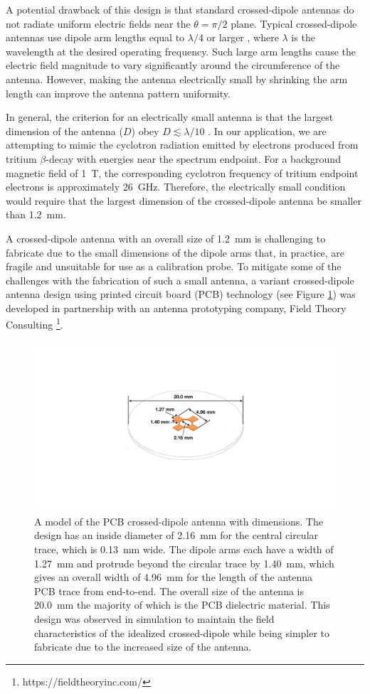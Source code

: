 A potential drawback of this design is that standard crossed-dipole antennas do not radiate uniform electric fields near the $\theta=\pi/2$ plane. Typical crossed-dipole antennas use dipole arm lengths equal to $\lambda/4$ or larger \cite{balanis2011modern}, where $\lambda$ is the wavelength at the desired operating frequency. Such large arm lengths cause the electric field magnitude to vary significantly around the circumference of the antenna. However, making the antenna electrically small by shrinking the arm length can improve the antenna pattern uniformity.

In general, the criterion for an electrically small antenna is that the largest dimension of the antenna ($D$) obey $D\lesssim\lambda/10$ \cite{balanis2015antenna}. In our application, we are attempting to mimic the cyclotron radiation emitted by electrons produced from tritium $\beta$-decay with energies near the spectrum endpoint. For a background magnetic field of 1~T, the corresponding cyclotron frequency of tritium endpoint electrons is approximately 26~GHz. Therefore, the electrically small condition would require that the largest dimension of the crossed-dipole antenna be smaller than 1.2~mm.

A crossed-dipole antenna with an overall size of 1.2~mm is challenging to fabricate due to the small dimensions of the dipole arms that, in practice, are fragile and unsuitable for use as a calibration probe. To mitigate some of the challenges with the fabrication of such a small antenna, a variant crossed-dipole antenna design using printed circuit board (PCB) technology (see Figure \ref{fig:cross-dipole-pcb-model}) was developed in partnership with an antenna prototyping company, Field Theory Consulting \footnote{https://fieldtheoryinc.com/}. 
\begin{figure}[h]
\centering
\includegraphics[width=.5\textwidth]{figs/Chapter-5/221101_cres_asbuilt_dims.pdf}
\qquad
\caption{\label{fig:cross-dipole-pcb-model} A model of the PCB crossed-dipole antenna with dimensions. The design has an inside diameter of 2.16~mm for the central circular trace, which is 0.13~mm wide. The dipole arms each have a width of 1.27~mm and protrude beyond the circular trace by 1.40~mm, which gives an overall width of 4.96~mm for the length of the antenna PCB trace from end-to-end. The overall size of the antenna is 20.0~mm the majority of which is the PCB dielectric material. This design was observed in simulation to maintain the field characteristics of the idealized crossed-dipole while being simpler to fabricate due to the increased size of the antenna.}
\end{figure}


